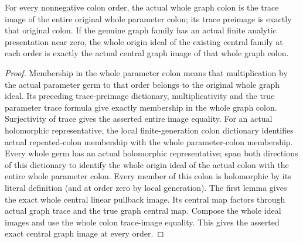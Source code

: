 \begin{lemma}
\label{hir:real-domain-all-whole-graph-colon-central-dictionaries}
\leanok
For every nonnegative colon order, the actual whole graph colon is the
trace image of the entire original whole parameter colon; its trace
preimage is exactly that original colon. If the genuine graph family has
an actual finite analytic presentation near zero, the whole origin ideal
of the existing central family at each order is exactly the actual central
graph image of that whole graph colon.
\end{lemma}
\begin{proof}
Membership in the whole parameter colon means that multiplication by the
actual parameter germ to that order belongs to the original whole graph
ideal. Its preceding trace-preimage dictionary, multiplicativity and the
true parameter trace formula give exactly membership in the whole graph
colon. Surjectivity of trace gives the asserted entire image equality.
For an actual holomorphic representative, the local finite-generation
colon dictionary identifies actual repeated-colon membership with the
whole parameter-colon membership. Every whole germ has an actual
holomorphic representative; span both directions of this dictionary to
identify the whole origin ideal of the actual colon with the entire whole
parameter colon. Every member of this colon is holomorphic by its literal
definition (and at order zero by local generation). The first lemma gives
the exact whole central linear pullback image. Its central map factors
through actual graph trace and the true graph central map. Compose the
whole ideal images and use the whole colon trace-image equality. This gives
the asserted exact central graph image at every order.
\end{proof}

